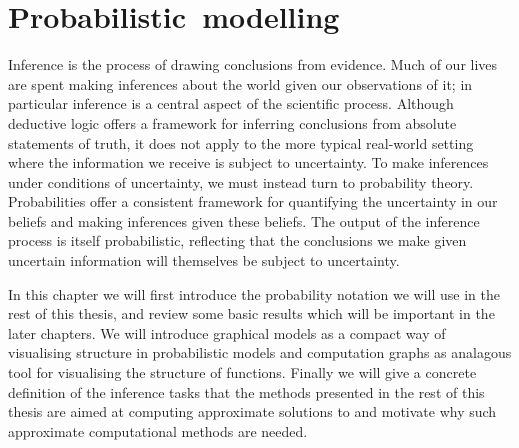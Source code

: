 \chapter{\mbox{Probabilistic modelling}}\label{ch:probabilistic-modelling}

Inference is the process of drawing conclusions from evidence. Much of our lives are spent making inferences about the world given our observations of it; in particular inference is a central aspect of the scientific process. Although deductive logic offers a framework for inferring conclusions from absolute statements of truth, it does not apply to the more typical real-world setting where the information we receive is subject to uncertainty. 
To make inferences under conditions of uncertainty, we must instead turn to probability theory. Probabilities offer a consistent framework for quantifying the uncertainty in our beliefs and making inferences given these beliefs. The output of the inference process is itself probabilistic, reflecting that the conclusions we make given uncertain information will themselves be subject to uncertainty. 


In this chapter we will first introduce the probability notation we will use in the rest of this thesis, and review some basic results which will be important in the later chapters. We will introduce graphical models as a compact way of visualising structure in probabilistic models and computation graphs as analagous tool for visualising the structure of functions. Finally we will give a concrete definition of the inference tasks that the methods presented in the rest of this thesis are aimed at computing approximate solutions to and motivate why such approximate computational methods are needed.

